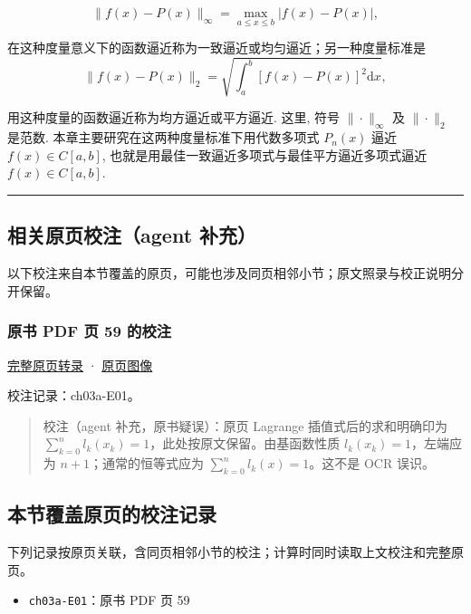 \documentclass[
  10pt,
  fontset=fandol]{ctexart}
\providecommand{\tightlist}{%
  \setlength{\itemsep}{0pt}\setlength{\parskip}{0pt}}
\begin{document}
\[
\| f(x) - P(x) \|_{\infty} = \max_{a \leqslant x \leqslant b} |f(x) - P(x)|, \tag{3.1.2}
\]

在这种度量意义下的函数逼近称为一致逼近或均匀逼近；另一种度量标准是 \[
\| f(x) - P(x) \|_{2} = \sqrt{\int_{a}^{b} [f(x) - P(x)]^{2} \mathrm{d}x}, \tag{3.1.3}
\]

用这种度量的函数逼近称为均方逼近或平方逼近. 这里, 符号 \(\| \cdot \|_{\infty}\) 及 \(\| \cdot \|_{2}\) 是范数. 本章主要研究在这两种度量标准下用代数多项式 \(P_{n}(x)\) 逼近 \(f(x) \in C[a,b]\), 也就是用最佳一致逼近多项式与最佳平方逼近多项式逼近 \(f(x) \in C[a,b]\).

\begin{center}\rule{0.5\linewidth}{0.5pt}\end{center}

\subsection{相关原页校注（agent 补充）}\label{ux76f8ux5173ux539fux9875ux6821ux6ce8agent-ux8865ux5145}

以下校注来自本节覆盖的原页，可能也涉及同页相邻小节；原文照录与校正说明分开保留。

\subsubsection{原书 PDF 页 59 的校注}\label{ux539fux4e66-pdf-ux9875-59-ux7684ux6821ux6ce8}

\href{../pages/pdf-059.md}{完整原页转录} · \href{../../source-images/pdf-059.jpeg}{原页图像}

校注记录：ch03a-E01。

\begin{quote}
校注（agent 补充，原书疑误）：原页 Lagrange 插值式后的求和明确印为 \(\sum_{k=0}^{n}l_k(x_k)=1\)，此处按原文保留。由基函数性质 \(l_k(x_k)=1\)，左端应为 \(n+1\)；通常的恒等式应为 \(\sum_{k=0}^{n}l_k(x)=1\)。这不是 OCR 误识。
\end{quote}

\subsection{本节覆盖原页的校注记录}\label{ux672cux8282ux8986ux76d6ux539fux9875ux7684ux6821ux6ce8ux8bb0ux5f55}

下列记录按原页关联，含同页相邻小节的校注；计算时同时读取上文校注和完整原页。

\begin{itemize}
\tightlist
\item
  \texttt{ch03a-E01}：原书 PDF 页 59
\end{itemize}
\end{document}
